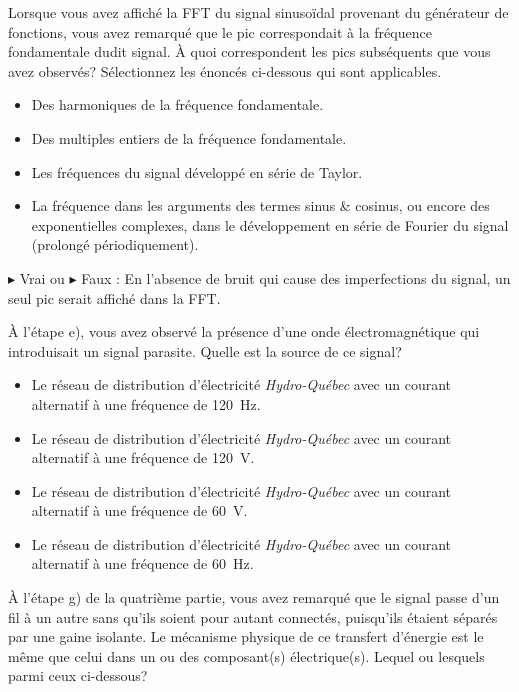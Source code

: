 \documentclass[canadien,12pt,oneside,letterpaper]{article}
\begin{document}
\begin{gradescope}
    \begin{gradescope} 
        \item Lorsque vous avez affiché la FFT du signal sinusoïdal provenant du générateur de fonctions, vous avez remarqué que le pic correspondait à la fréquence fondamentale dudit signal. À quoi correspondent les pics subséquents que vous avez observés? Sélectionnez les énoncés ci-dessous qui sont applicables.
        \begin{itemize}[label=$\blacktriangleright$]
            \item Des harmoniques de la fréquence fondamentale.
            \item Des multiples entiers de la fréquence fondamentale.
            \item Les fréquences du signal développé en série de Taylor.
            \item La fréquence dans les arguments des termes sinus \& cosinus, ou encore des exponentielles complexes, dans le développement en série de Fourier du signal (prolongé périodiquement).
        \end{itemize}
        \item $\blacktriangleright$ Vrai ou $\blacktriangleright$ Faux : En l'absence de bruit qui cause des imperfections du signal, un seul pic serait affiché dans la FFT.
        \item À l'étape e), vous avez observé la présence d'une onde électromagnétique qui introduisait un signal parasite. Quelle est la source de ce signal?
		\begin{itemize}[label=$\blacktriangleright$]
        	\item Le réseau de distribution d'électricité \textit{Hydro-Québec} avec un courant alternatif à une fréquence de \qty{120}{\Hz}.
        	\item Le réseau de distribution d'électricité \textit{Hydro-Québec} avec un courant alternatif à une fréquence de \qty{120}{\volt}.
        	\item Le réseau de distribution d'électricité \textit{Hydro-Québec} avec un courant alternatif à une fréquence de \qty{60}{\volt}.
            \item Le réseau de distribution d'électricité \textit{Hydro-Québec} avec un courant alternatif à une fréquence de \qty{60}{\Hz}.
        	\end{itemize}
        \item À l'étape g) de la quatrième partie, vous avez remarqué que le signal passe d'un fil à un autre sans qu'ils soient pour autant connectés, puisqu'ils étaient séparés par une gaine isolante. Le mécanisme physique de ce transfert d'énergie est le même que celui dans un ou des composant(s) électrique(s). Lequel ou lesquels parmi ceux ci-dessous?

\end{gradescope}
\end{gradescope}
\end{document}

